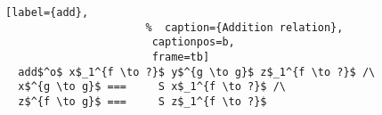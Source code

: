 \begin{figure}[!t]
  \centering
  \begin{minipage}{\columnwidth}
    \begin{lstlisting}[label={add},
                      %  caption={Addition relation},
                       captionpos=b,
                       frame=tb]
  add$^o$ x$_1^{f \to ?}$ y$^{g \to g}$ z$_1^{f \to ?}$ /\
  x$^{g \to g}$ ===     S x$_1^{f \to ?}$ /\
  z$^{f \to g}$ ===     S z$_1^{f \to ?}$
    \end{lstlisting}
  \end{minipage}
\end{figure}